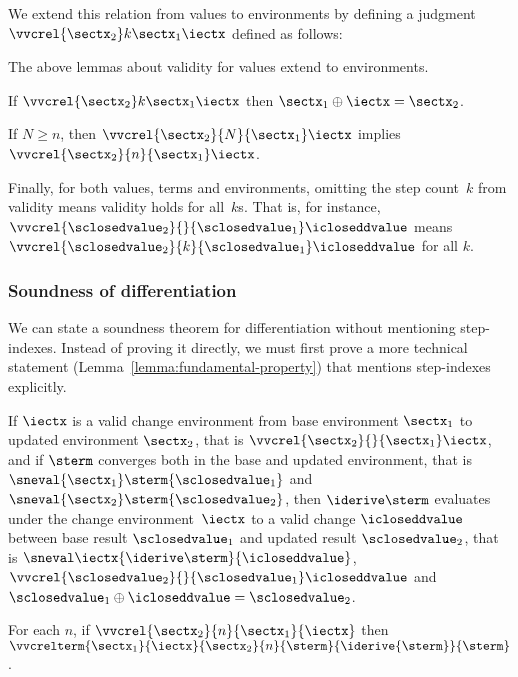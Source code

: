 \noindent
We extend this relation from values to environments by defining a
judgment $\vvcrel {\sectx_2} k {\sectx_1} \iectx$ defined as follows:
\begin{mathpar}

\end{mathpar}

The above lemmas about validity for values extend to environments.
\begin{lemma}
  \label{lemma:crel-oplus-env}
  If
  $\vvcrel {\sectx_2} k {\sectx_1} \iectx$ then
  $\sectx_1 \oplus \iectx = \sectx_2$.
\end{lemma}
\begin{lemma}
  \label{lemma:vvcrel-antimono-env}
  If $N \ge n$, then $\vvcrel{\sectx_2} {N} {\sectx_1} \iectx$ implies
  $\vvcrel{\sectx_2} {n} {\sectx_1} \iectx$.
\end{lemma}

Finally, for both values, terms and environments, omitting the step
count~$k$ from validity means validity holds for all~$k$s. That is,
for instance,
$\vvcrel {\sclosedvalue_2} {} {\sclosedvalue_1} \icloseddvalue$ means
$\vvcrel {\sclosedvalue_2} {k} {\sclosedvalue_1} \icloseddvalue$ for
all $k$.

\subsubsection{Soundness of differentiation}


We can state a soundness theorem for differentiation without
mentioning step-indexes. Instead of proving it directly, we must first
prove a more technical statement
(Lemma~\ref{lemma:fundamental-property}) that mentions step-indexes
explicitly.
%
\begin{theorem}
  \label{thm:sound-derive}
  If $\iectx$ is a valid change environment from base environment $\sectx_1$ to
  updated environment $\sectx_2$, that is $\vvcrel {\sectx_2} {} {\sectx_1}\iectx$,
  and if $\sterm$ converges both in the base and updated environment, that is
  $\sneval{\sectx_1}\sterm{\sclosedvalue_1}$ and
  $\sneval{\sectx_2}\sterm{\sclosedvalue_2}$,
  then $\iderive\sterm$ evaluates under the change environment~$\iectx$ to a valid
  change $\icloseddvalue$ between base result ${\sclosedvalue_1}$ and updated result
  ${\sclosedvalue_2}$, that is
  $\sneval\iectx{\iderive\sterm}{\icloseddvalue}$,
  $\vvcrel{\sclosedvalue_2} {} {\sclosedvalue_1}
  \icloseddvalue$ and
  $\sclosedvalue_1 \oplus \icloseddvalue = \sclosedvalue_2$.
\end{theorem}

\begin{lemma}
  \label{lemma:fundamental-property}
For each $n$,
if $\vvcrel{\sectx_2}{n}{\sectx_1}{\iectx}$ then
$\vvcrelterm{\sectx_1}{\iectx}{\sectx_2}{n}{\sterm}{\iderive{\sterm}}{\sterm}$.
\end{lemma}

